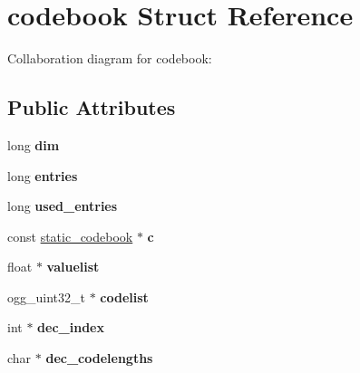 \hypertarget{structcodebook}{\section{codebook Struct Reference}
\label{structcodebook}
}


Collaboration diagram for codebook\+:
\subsection*{Public Attributes}
\begin{DoxyCompactItemize}
\item 
\hypertarget{structcodebook_a686979784ac16e673f22201ed3c4a155}{long {\bfseries dim}}\label{structcodebook_a686979784ac16e673f22201ed3c4a155}

\item 
\hypertarget{structcodebook_ad025d4a6ebb7417a99870380bfbd1a66}{long {\bfseries entries}}\label{structcodebook_ad025d4a6ebb7417a99870380bfbd1a66}

\item 
\hypertarget{structcodebook_a4ab1a61278a77046c0a213b7ddfe748c}{long {\bfseries used\+\_\+entries}}\label{structcodebook_a4ab1a61278a77046c0a213b7ddfe748c}

\item 
\hypertarget{structcodebook_ad3f2dd8f3ad3efffbb5f60d467133ab0}{const \hyperlink{structstatic__codebook}{static\+\_\+codebook} $\ast$ {\bfseries c}}\label{structcodebook_ad3f2dd8f3ad3efffbb5f60d467133ab0}

\item 
\hypertarget{structcodebook_ac3365da931532e158435f2e62021c90b}{float $\ast$ {\bfseries valuelist}}\label{structcodebook_ac3365da931532e158435f2e62021c90b}

\item 
\hypertarget{structcodebook_a2ea951b8092a4a68551bbd9728fc86af}{ogg\+\_\+uint32\+\_\+t $\ast$ {\bfseries codelist}}\label{structcodebook_a2ea951b8092a4a68551bbd9728fc86af}

\item 
\hypertarget{structcodebook_a25d9abb79519e5740fae3c635bff7031}{int $\ast$ {\bfseries dec\+\_\+index}}\label{structcodebook_a25d9abb79519e5740fae3c635bff7031}

\item 
\hypertarget{structcodebook_aad33e74f39a1b209834804a8d28031c2}{char $\ast$ {\bfseries dec\+\_\+codelengths}}\label{structcodebook_aad33e74f39a1b209834804a8d28031c2}


\end{DoxyCompactItemize}
